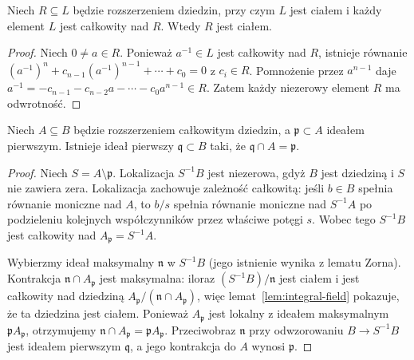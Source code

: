 \begin{lemat}
\label{lem:integral-field}
Niech $R\subseteq L$ będzie rozszerzeniem dziedzin,
przy czym $L$ jest ciałem i każdy element $L$ jest
całkowity nad $R$. Wtedy $R$ jest ciałem.
\end{lemat}
\begin{proof}
Niech $0\ne a\in R$. Ponieważ $a^{-1}\in L$ jest
całkowity nad $R$, istnieje równanie
$(a^{-1})^n+c_{n-1}(a^{-1})^{n-1}+\cdots+c_0=0$
z $c_i\in R$. Pomnożenie przez $a^{n-1}$
daje $a^{-1}=-c_{n-1}-c_{n-2}a-\cdots-c_0a^{n-1}\in R$.
Zatem każdy niezerowy element $R$ ma odwrotność.
\end{proof}

\begin{twierdzenie}
\label{tw:lying-over}
Niech $A\subseteq B$ będzie rozszerzeniem całkowitym
dziedzin, a $\mathfrak p\subset A$ ideałem pierwszym.
Istnieje ideał pierwszy $\mathfrak q\subset B$ taki,
że $\mathfrak q\cap A=\mathfrak p$.
\end{twierdzenie}
\begin{proof}
Niech $S=A\setminus\mathfrak p$. Lokalizacja
$S^{-1}B$ jest niezerowa, gdyż $B$ jest dziedziną
i $S$ nie zawiera zera. Lokalizacja zachowuje
zależność całkowitą: jeśli $b\in B$ spełnia
równanie moniczne nad $A$, to $b/s$ spełnia
równanie moniczne nad $S^{-1}A$ po podzieleniu
kolejnych współczynników przez właściwe potęgi $s$.
Wobec tego $S^{-1}B$ jest całkowity nad
$A_{\mathfrak p}=S^{-1}A$.

Wybierzmy ideał maksymalny $\mathfrak n$ w
$S^{-1}B$ (jego istnienie wynika z lematu Zorna).
Kontrakcja $\mathfrak n\cap A_{\mathfrak p}$
jest maksymalna: iloraz
$(S^{-1}B)/\mathfrak n$ jest ciałem i jest
całkowity nad dziedziną
$A_{\mathfrak p}/(\mathfrak n\cap A_{\mathfrak p})$,
więc lemat~\ref{lem:integral-field} pokazuje,
że ta dziedzina jest ciałem. Ponieważ
$A_{\mathfrak p}$ jest lokalny z ideałem maksymalnym
$\mathfrak p A_{\mathfrak p}$, otrzymujemy
$\mathfrak n\cap A_{\mathfrak p}
=\mathfrak p A_{\mathfrak p}$.
Przeciwobraz $\mathfrak n$ przy odwzorowaniu
$B\to S^{-1}B$ jest ideałem pierwszym
$\mathfrak q$, a jego kontrakcja do $A$
wynosi $\mathfrak p$.
\end{proof}

